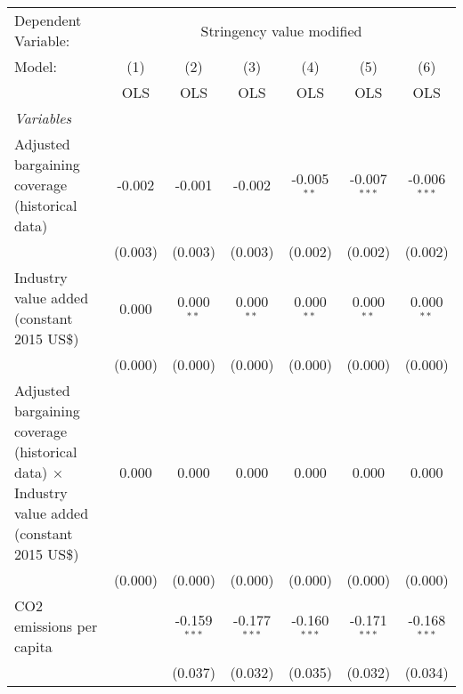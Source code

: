 
\begingroup
\centering
\begin{tabular}{lcccccc}
   \toprule
   Dependent Variable: & \multicolumn{6}{c}{Stringency value modified}\\
   Model:                                                                                              & (1)     & (2)            & (3)            & (4)            & (5)            & (6)\\  
                                                                                                       &  OLS    & OLS            & OLS            & OLS            & OLS            & OLS\\  
   \midrule
   \emph{Variables}\\
   Adjusted bargaining coverage (historical data)                                                      & -0.002  & -0.001         & -0.002         & -0.005$^{**}$  & -0.007$^{***}$ & -0.006$^{***}$\\   
                                                                                                       & (0.003) & (0.003)        & (0.003)        & (0.002)        & (0.002)        & (0.002)\\   
   Industry value added (constant 2015 US\$)                                                           & 0.000   & 0.000$^{**}$   & 0.000$^{**}$   & 0.000$^{**}$   & 0.000$^{**}$   & 0.000$^{**}$\\   
                                                                                                       & (0.000) & (0.000)        & (0.000)        & (0.000)        & (0.000)        & (0.000)\\   
   Adjusted bargaining coverage (historical data) $\times$ Industry value added (constant 2015 US\$)   & 0.000   & 0.000          & 0.000          & 0.000          & 0.000          & 0.000\\   
                                                                                                       & (0.000) & (0.000)        & (0.000)        & (0.000)        & (0.000)        & (0.000)\\   
   CO2 emissions per capita                                                                            &         & -0.159$^{***}$ & -0.177$^{***}$ & -0.160$^{***}$ & -0.171$^{***}$ & -0.168$^{***}$\\   
                                                                                                       &         & (0.037)        & (0.032)        & (0.035)        & (0.032)        & (0.034)\\   

\end{tabular}
